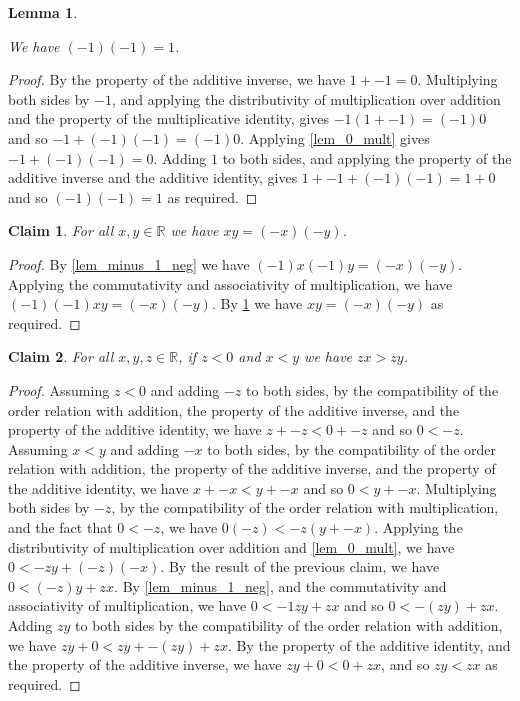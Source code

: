 \documentclass{article}
\theoremstyle{plain}
\newtheorem{lem}[thm]{Lemma}
\newtheorem*{claim}{Claim}
\begin{document}
\begin{lem}
    \label{lem_sq_min_one}
    
    We have $(-1)(-1) = 1$.
\end{lem}

\begin{proof}
    By the property of the additive inverse, we have $1 + -1 = 0$. Multiplying both sides by $-1$, and applying the distributivity of multiplication over addition and the property of the multiplicative identity, gives $-1(1 + -1) = (-1)0$ and so $-1 + (-1)(-1) = (-1)0$. Applying \cref{lem_0_mult} gives $-1 + (-1)(-1) = 0$. Adding $1$ to both sides, and applying the property of the additive inverse and the additive identity, gives $1 + -1 + (-1)(-1) = 1 + 0$ and so $(-1)(-1) = 1$ as required.
\end{proof}

\begin{claim}
    For all $x,y \in \mathbb{R}$ we have $xy = (-x)(-y)$.
\end{claim}

\begin{proof}
    By \cref{lem_minus_1_neg} we have $(-1)x(-1)y = (-x)(-y)$. Applying the commutativity and associativity of multiplication, we have $(-1)(-1)xy = (-x)(-y)$. By \cref{lem_sq_min_one} we have $xy = (-x)(-y)$ as required.
\end{proof}

\begin{claim}
    For all $x,y,z \in \mathbb{R}$, if $z < 0$ and $x < y$ we have $zx > zy$.
\end{claim}

\begin{proof}
    Assuming $z < 0$ and adding $-z$ to both sides, by the compatibility of the order relation with addition, the property of the additive inverse, and the property of the additive identity, we have $z + -z < 0 + -z$ and so $0 < -z$. \\
    Assuming $x < y$ and adding $-x$ to both sides, by the compatibility of the order relation with addition, the property of the additive inverse, and the property of the additive identity, we have $x + -x < y + -x$ and so $0 < y + -x$. Multiplying both sides by $-z$, by the compatibility of the order relation with multiplication, and the fact that $0 < -z$, we have $0(-z) < -z(y + -x)$. Applying the distributivity of multiplication over addition and \cref{lem_0_mult}, we have $0 < -zy + (-z)(-x)$. By the result of the previous claim, we have $0 < (-z)y + zx$. By \cref{lem_minus_1_neg}, and the commutativity and associativity of multiplication, we have $0 < -1zy + zx$ and so $0 < -(zy) + zx$. Adding $zy$ to both sides by the compatibility of the order relation with addition, we have $zy + 0 < zy + -(zy) + zx$. By the property of the additive identity, and the property of the additive inverse, we have $zy + 0 < 0 + zx$, and so $zy < zx$ as required.
\end{proof}
\end{document}
